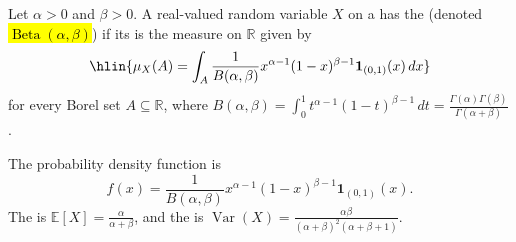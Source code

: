 \begin{definition} \label{definition:beta_distribution}
Let $\alpha > 0$ and $\beta > 0$. A real-valued random variable $X$ on a  has the  (denoted \hl{$\operatorname{Beta}(\alpha, \beta)$}) if its  is the measure on $\mathbb{R}$ given by
$$\hlin{\mu_X(A) = \int_A \frac{1}{B(\alpha, \beta)} x^{\alpha - 1} (1 - x)^{\beta - 1} \mathbf{1}_{(0, 1)}(x) \, dx}$$
for every Borel set $A \subseteq \mathbb{R}$, where $B(\alpha, \beta) = \int_0^1 t^{\alpha - 1} (1 - t)^{\beta - 1} \, dt = \tfrac{\Gamma(\alpha)\Gamma(\beta)}{\Gamma(\alpha + \beta)}$.

The probability density function is $$f(x) = \frac{1}{B(\alpha, \beta)} x^{\alpha - 1} (1 - x)^{\beta - 1} \mathbf{1}_{(0, 1)}(x).$$ The  is $\mathbb{E}[X] = \tfrac{\alpha}{\alpha + \beta}$, and the  is $\operatorname{Var}(X) = \tfrac{\alpha\beta}{(\alpha + \beta)^2(\alpha + \beta + 1)}$.
\end{definition}